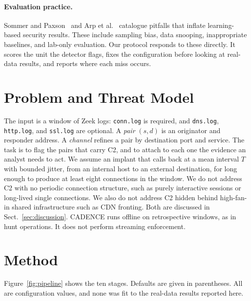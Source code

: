 \documentclass[runningheads]{llncs}
\begin{document}
\paragraph{Evaluation practice.}
Sommer and Paxson~\cite{sommer2010closed} and Arp et al.~\cite{arp2022dos} catalogue pitfalls that inflate learning-based security results. These include sampling bias, data snooping, inappropriate baselines, and lab-only evaluation. Our protocol responds to these directly. It scores the unit the detector flags, fixes the configuration before looking at real-data results, and reports where each miss occurs.

\section{Problem and Threat Model}

The input is a window of Zeek logs: \texttt{conn.log} is required, and \texttt{dns.log}, \texttt{http.log}, and \texttt{ssl.log} are optional. A \emph{pair} $(s,d)$ is an originator and responder address. A \emph{channel} refines a pair by destination port and service. The task is to flag the pairs that carry C2, and to attach to each one the evidence an analyst needs to act. We assume an implant that calls back at a mean interval $T$ with bounded jitter, from an internal host to an external destination, for long enough to produce at least eight connections in the window. We do not address C2 with no periodic connection structure, such as purely interactive sessions or long-lived single connections. We also do not address C2 hidden behind high-fan-in shared infrastructure such as CDN fronting. Both are discussed in Sect.~\ref{sec:discussion}. CADENCE runs offline on retrospective windows, as in hunt operations. It does not perform streaming enforcement.

\section{Method}\label{sec:method}

Figure~\ref{fig:pipeline} shows the ten stages. Defaults are given in parentheses. All are configuration values, and none was fit to the real-data results reported here.
\end{document}
